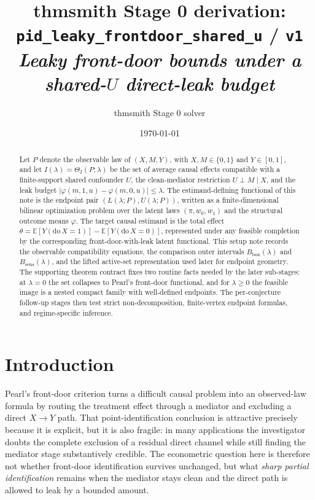 \documentclass[11pt]{article}
\title{thmsmith Stage 0 derivation: \texttt{pid\_leaky\_frontdoor\_shared\_u} / \texttt{v1}%
  \\ \large\textit{Leaky front-door bounds under a shared-\(U\) direct-leak budget}}
\author{thmsmith Stage 0 solver}
\date{\today}
\newcommand{\E}{\mathbb{E}}
\theoremstyle{definition}
\theoremstyle{plain}
\theoremstyle{remark}
\begin{document}
\maketitle


\providecommand{\citet}[1]{\cite{#1}}

\begin{abstract}
Let \(P\) denote the observable law of \((X,M,Y)\), with \(X,M\in\{0,1\}\) and
\(Y\in[0,1]\), and let \(I(\lambda)=\Theta_I(P;\lambda)\) be the set of average causal
effects compatible with a finite-support shared confounder \(U\), the clean-mediator
restriction \(U\perp M\mid X\), and the leak budget
\(|\varphi(m,1,u)-\varphi(m,0,u)|\le \lambda\). The estimand-defining functional of
this note is the endpoint pair \((L(\lambda;P),U(\lambda;P))\), written as a
finite-dimensional bilinear optimization problem over the latent laws
\((\pi,w_0,w_1)\) and the structural outcome means \(\varphi\). The target causal
estimand is the total effect
\(\theta=\E[Y(\mathrm{do}\,X=1)]-\E[Y(\mathrm{do}\,X=0)]\), represented under any
feasible completion by the corresponding front-door-with-leak latent functional.
This setup note records the observable compatibility equations, the comparison outer
intervals \(B_{\mathrm{box}}(\lambda)\) and \(B_{\mathrm{sens}}(\lambda)\), and the
lifted active-set representation used later for endpoint geometry. The supporting
theorem contract fixes two routine facts needed by the later sub-stages: at
\(\lambda=0\) the set collapses to Pearl's front-door functional, and for
\(\lambda\ge 0\) the feasible image is a nested compact family with well-defined
endpoints. The per-conjecture follow-up stages then test strict non-decomposition,
finite-vertex endpoint formulas, and regime-specific inference.
\end{abstract}

\section{Introduction}
Pearl's front-door criterion turns a difficult causal problem into an observed-law
formula by routing the treatment effect through a mediator and excluding a direct
\(X\to Y\) path. That point-identification conclusion is attractive precisely because
it is explicit, but it is also fragile: in many applications the investigator doubts
the complete exclusion of a residual direct channel while still finding the mediator
stage substantively credible. The econometric question here is therefore not whether
front-door identification survives unchanged, but what \emph{sharp partial
identification} remains when the mediator stays clean and the direct path is allowed
to leak by a bounded amount.
\end{document}

